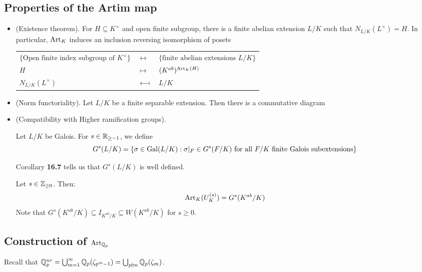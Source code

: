 \documentclass[10pt,a4paper]{article}
\begin{document}
\subsection{Properties of the Artim map}
\begin{itemize}
  \item (Existence theorem). For $H \subseteq K^\times$ and open finite subgroup, there is a finite abelian extension $L/K$ such that $N_{L/K}(L^\times) = H$. In particular, $\operatorname{Art}_K$ induces an inclusion reversing isomorphism of posets

  \begin{tabular}{p{}p{}p{}}
    \raggedleft $\{\text{Open finite index subgroup of $K^\times$}\}$ & $\longleftrightarrow$ & $\{\text{finite abelian extensions } L/K\}$\\
    \raggedleft $H$ & $\longmapsto$ & $(K^{ab})^{\operatorname{Art}_K(H)}$\\
    \raggedleft $N_{L/K}(L^\times)$ & $\longmapsfrom$ & $L/K$
  \end{tabular}
  \item (Norm functoriality). Let $L/K$ be a finite separable extension. Then there is a commutative diagram
  \begin{center}
  \end{center}
  \item (Compatibility with Higher ramification groups).
  \begin{definition}
    Let $L/K$ be Galois. For $s \in \mathbb{R}_{\geq -1}$, we define
    \[G^s(L/K) = \{\sigma \in \operatorname{Gal}(L/K) : \sigma|_{F} \in G^s(F/K) \text{ for all $F/K$ finite Galois subextensions}\}\]
  \end{definition}
  Corollary \textbf{16.7} tells us that $G^s(L/K)$ is well defined.

  Let $s \in \mathbb{Z}_{\geq 0}$. Then:
  \[\operatorname{Art}_K(U_K^{(s)}) = G^s(K^{ab}/K)\]
  Note that $G^s(K^{ab}/K) \subseteq I_{K^{ab}/K} \subseteq W(K^{ab}/K)$ for $s \geq 0$.
\end{itemize}
\subsection{Construction of $\operatorname{Art}_{\mathbb{Q}_p}$}
Recall that $\mathbb{Q}_p^{ur} = \bigcup_{m=1}^\infty \mathbb{Q}_p(\zeta_{p^m - 1}) = \bigcup_{p \nmid m} \mathbb{Q}_p(\zeta_m)$.
\end{document}

